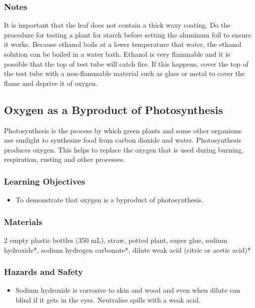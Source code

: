 \subsubsection*{Notes}
It is important that the leaf does not contain a thick waxy coating. Do the procedure for testing a plant for starch before setting the aluminum foil to ensure it works.
Because ethanol boils at a lower temperature that water, the ethanol solution can be boiled in a water bath. Ethanol is very flammable and it is possible that the top of test tube will catch fire. If this happens, cover the top of the test tube with a non-flammable material such as glass or metal to cover the flame and deprive it of oxygen.

\subsection{Oxygen as a Byproduct of Photosynthesis}

Photosynthesis is the process by which green plants and some other organisms use sunlight to synthesize food from carbon dioxide and water. Photosynthesis produces oxygen. This helps to replace the oxygen that is used during burning, respiration, rusting and other processes.

\subsubsection*{Learning Objectives}
\begin{itemize}
\item{To demonstrate that oxygen is a byproduct of photosynthesis.}
\end{itemize}


\subsubsection*{Materials}
2 empty plastic bottles (350 mL), straw, potted plant, super glue, sodium hydroxide*, sodium hydrogen carbonate*, dilute weak acid (citric or acetic acid)*

\subsubsection*{Hazards and Safety}
\begin{itemize}
\item{Sodium hydroxide is corrosive to skin and wood and even when dilute can blind if it gets in the eyes. Neutralise spills with a weak acid.}
\end{itemize}

